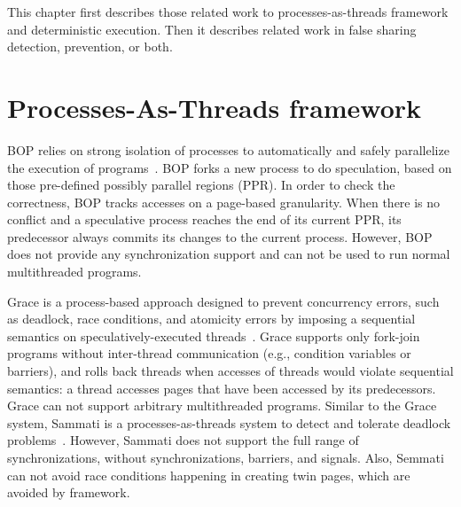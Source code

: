 
\label{chapter:relatedwork}
This chapter first describes those related work to processes-as-threads framework and deterministic execution. Then it describes related work in false sharing detection, prevention, or both. 

\section{Processes-As-Threads framework}

BOP relies on strong isolation of processes to automatically and safely parallelize the execution of programs~\cite{DingBOP}. BOP forks a new process to do speculation, based on those pre-defined possibly parallel regions (PPR). In order to check the correctness, BOP tracks accesses on a page-based granularity. When there is no conflict and a speculative process reaches the end of its current PPR, its predecessor always commits its changes to the current process. However, BOP does not provide any synchronization support and can not be used to run normal multithreaded programs. 

Grace is a process-based approach designed to prevent
concurrency errors, such as deadlock, race conditions, and
atomicity errors by imposing a sequential semantics on
speculatively-executed threads~\cite{grace}. Grace supports only fork-join programs without inter-thread communication (e.g., condition variables or barriers), and rolls back threads when accesses of threads would violate sequential semantics: a thread accesses pages that have been accessed by its predecessors. Grace can not support arbitrary multithreaded programs. Similar to the Grace system, Sammati is a processes-as-threads system to detect and tolerate deadlock problems~\cite{Pyla:2010:ADA:1854273.1854288}. However, Sammati does not support the full range of synchronizations, without synchronizations, barriers, and signals. Also, Semmati can not avoid race conditions happening in creating twin pages, which are avoided by \Sheriff{} framework.

\begin{comment}
According to Revisions,  Grace cannot easily resolve all
conflicts on commit (like revisions do) and must thus restrict
tasks from producing such conflicts either statically (by type
system) or dynamically (pessimistic with blocking, or optimistic with abort and retry). Also, Grace allows only a restricted “fork-join” form of concurrency
Revisions~\ref{Burckhardt:2010:CPR:1869459.1869515}
\end{comment}

